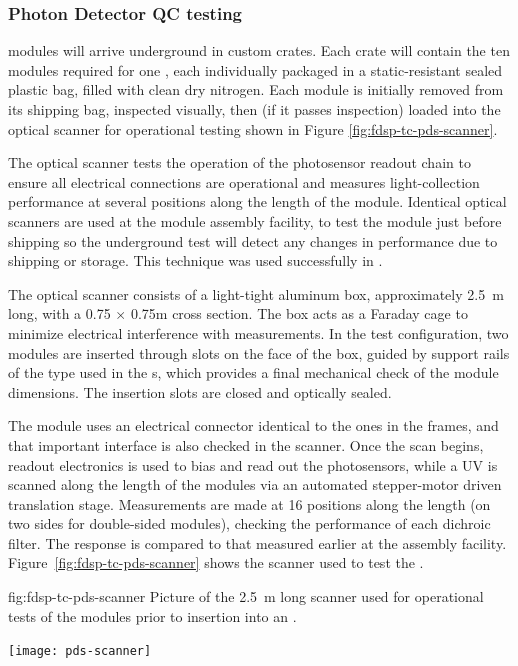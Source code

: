 \subsubsection{Photon Detector QC testing}
 modules will arrive underground in custom crates.  
Each crate will contain the ten modules required for one , each individually packaged in a static-resistant sealed plastic bag, filled with clean dry nitrogen. 
Each  module is initially removed from its shipping bag, inspected visually, then (if it passes inspection) loaded into the optical scanner for operational testing shown in Figure \ref{fig:fdsp-tc-pds-scanner}.

The optical scanner tests the operation of the photosensor readout chain to ensure all electrical connections are operational and measures light-collection performance at several positions along the length of the module.
Identical optical scanners are used at the module assembly facility, to test the module just before shipping so the underground test will detect any changes in performance due to shipping or storage.  
This technique was used successfully in .

The optical scanner consists of a light-tight aluminum box, approximately \SI{2.5}{m} long, with a \num{0.75} $\times$ \num{0.75}m cross section. 
The box acts as a Faraday cage to minimize electrical interference with measurements. In the  test configuration, two  modules are inserted through slots on the face of the box, guided by support rails of the type used in the s, which provides a final mechanical check of the  module dimensions.  
The insertion slots are closed and optically sealed.

The  module uses an electrical connector identical to the ones in the  frames, and that important interface is also checked in the scanner.  
Once the scan begins,   readout electronics is used to bias and read out the photosensors, while a UV  is scanned along the length of the modules via an automated stepper-motor driven translation stage.  Measurements are made at 16 positions along the length (on two sides for double-sided  modules), checking the performance of each  dichroic filter. The response is compared to that measured earlier at the assembly facility. Figure~\ref{fig:fdsp-tc-pds-scanner} shows the scanner used to test the  .

\begin{dunefigure}{fig:fdsp-tc-pds-scanner}
{Picture of the \SI{2.5}{m} long scanner used for operational tests of the   modules prior to insertion into an .} 

\texttt{[image: pds-scanner]}
\end{dunefigure}

